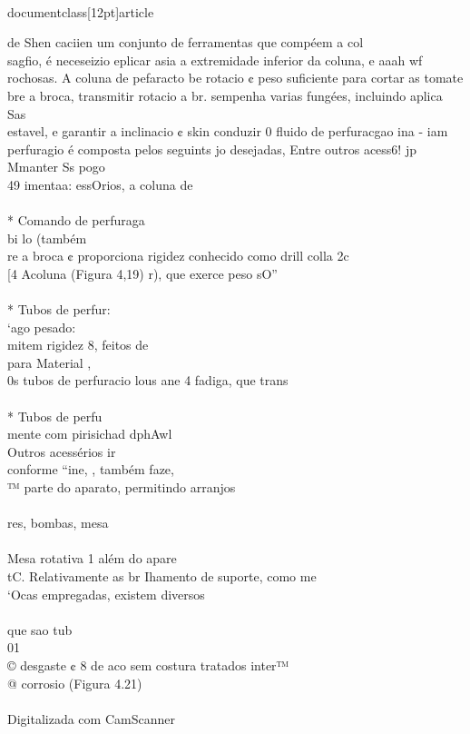 \\documentclass[12pt]{article}
\begin{document}
{de Shen caciien um conjunto de ferramentas que compéem a col\\
sagfio, é neceseizio eplicar asia a extremidade inferior da coluna, e aaah wf\\
rochosas. A coluna de pefaracto be rotacio ¢ peso suficiente para cortar as tomate\\
bre a broca, transmitir rotacio a br. sempenha varias fungées, incluindo aplica Sas\\
estavel, e garantir a inclinacio ¢ skin conduzir 0 fluido de perfuracgao ina - iam\\
perfuragio é composta pelos seguints jo desejadas, Entre outros acess6! jp Mmanter Ss pogo\\
49 imentaa: essOrios, a coluna de\\
\\
* Comando de perfuraga\\
bi lo (também\\
re a broca ¢ proporciona rigidez conhecido como drill colla 2c\\
[4 Acoluna (Figura 4,19) r), que exerce peso sO”\\
\\
* Tubos de perfur:\\
‘ago pesado:\\
mitem rigidez 8, feitos de\\
para Material ,\\
0s tubos de perfuracio lous ane 4 fadiga, que trans\\
\\
* Tubos de perfu\\
mente com pirisichad dphAwl\\
Outros acessérios ir\\
conforme “ine, , também faze,\\
™ parte do aparato, permitindo arranjos\\
\\
res, bombas, mesa\\
\\} Mesa rotativa 1 além do apare\\
tC. Relativamente as br Ihamento de suporte, como me\\
‘Ocas empregadas, existem diversos\\
\\
que sao tub\\
01\\
© desgaste ¢ 8 de aco sem costura tratados inter™\\
@ corrosio (Figura 4.21)\\
\\
Digitalizada com CamScanner\\
\end{document}
